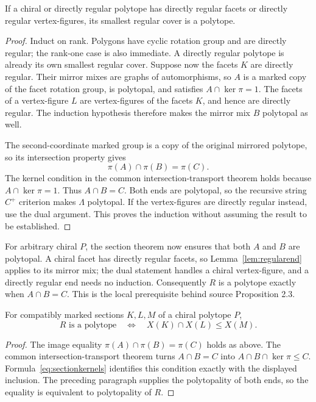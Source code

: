 \begin{lemma}\label{lem:regularend}
If a chiral or directly regular polytope has directly regular facets or directly regular vertex-figures, its smallest regular cover is a polytope.
\end{lemma}
\begin{proof}
Induct on rank. Polygons have cyclic rotation group and are directly regular; the rank-one case is also immediate. A directly regular polytope is already its own smallest regular cover. Suppose now the facets $K$ are directly regular. Their mirror mixes are graphs of automorphisms, so $A$ is a marked copy of the facet rotation group, is polytopal, and satisfies $A\cap\ker\pi=1$. The facets of a vertex-figure $L$ are vertex-figures of the facets $K$, and hence are directly regular. The induction hypothesis therefore makes the mirror mix $B$ polytopal as well.

The second-coordinate marked group is a copy of the original mirrored polytope, so its intersection property gives
\[
                     \pi(A)\cap\pi(B)=\pi(C).
\]
The kernel condition in the common intersection-transport theorem holds because $A\cap\ker\pi=1$. Thus $A\cap B=C$. Both ends are polytopal, so the recursive string $C^+$ criterion makes $\Lambda$ polytopal. If the vertex-figures are directly regular instead, use the dual argument. This proves the induction without assuming the result to be established.
\end{proof}

For arbitrary chiral $P$, the section theorem now ensures that both $A$ and $B$ are polytopal. A chiral facet has directly regular facets, so Lemma~\ref{lem:regularend} applies to its mirror mix; the dual statement handles a chiral vertex-figure, and a directly regular end needs no induction. Consequently $R$ is a polytope exactly when $A\cap B=C$. This is the local prerequisite behind source Proposition 2.3.

\begin{theorem}\label{thm:covercriterion}
For compatibly marked sections $K,L,M$ of a chiral polytope $P$,
\[
 R\text{ is a polytope}
       \quad\Longleftrightarrow\quad X(K)\cap X(L)\leq X(M).
\]
\end{theorem}
\begin{proof}
The image equality $\pi(A)\cap\pi(B)=\pi(C)$ holds as above. The common intersection-transport theorem turns $A\cap B=C$ into $A\cap B\cap\ker\pi\leq C$. Formula~\eqref{eq:sectionkernels} identifies this condition exactly with the displayed inclusion. The preceding paragraph supplies the polytopality of both ends, so the equality is equivalent to polytopality of $R$.
\end{proof}

